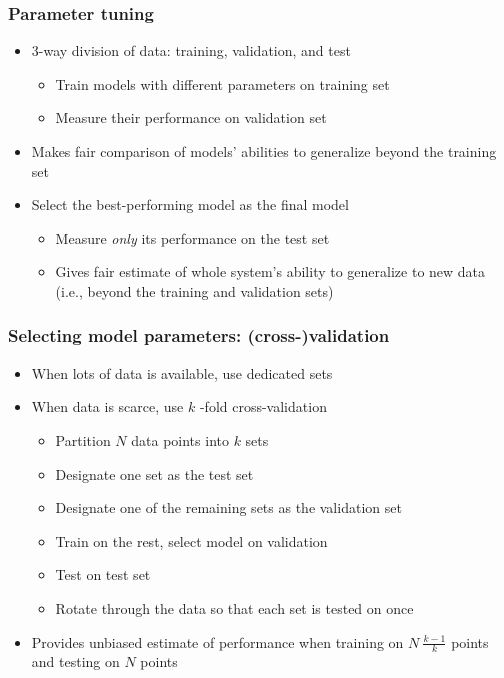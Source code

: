 \documentclass[12pt,notes,mathserif]{beamer}
\begin{document}
\begin{frame}[c]
\frametitle{Parameter tuning}
\begin{itemize}
\item  3-way division of data: training, validation, and test
		\begin{itemize}
		\item  Train models with different parameters on training set
		\item Measure their performance on validation set
		\end{itemize}
\item  Makes fair comparison of models' abilities to generalize beyond the training set

\item  Select the best-performing model as the final model
		\begin{itemize}
		\item  Measure \textit{only} its performance on the test set
		\item Gives fair estimate of whole system's ability to generalize to new data (i.e., beyond the training and validation sets)
		\end{itemize}
\end{itemize}
\end{frame}


\begin{frame}[c]
\frametitle{Selecting model parameters: (cross-)validation}
\begin{itemize}
\item  When lots of data is available, use dedicated sets
\item  When data is scarce, use $k$ -fold cross-validation
		\begin{itemize}
		\item  Partition $N$ data points into $k$ sets
		\item Designate one set as the test set
		\item Designate one of the remaining sets as the validation set
		\item Train on the rest, select model on validation
		\item Test on test set
		\item Rotate through the data so that each set is tested on once
		\end{itemize}

\item  Provides unbiased estimate of performance when training on $N~\frac{k-1}{k}$ points and testing on $N$ points
\end{itemize}
\end{frame}
\end{document}

